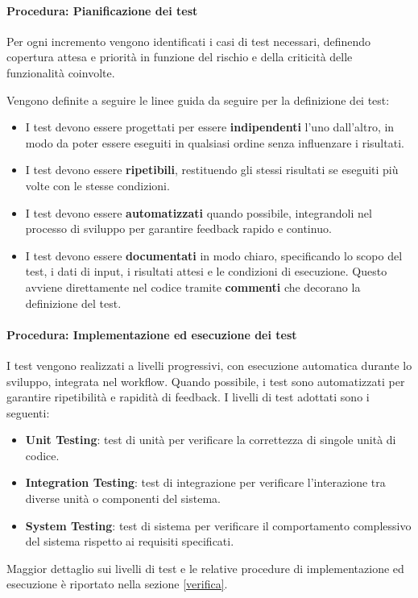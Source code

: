 \documentclass[a4paper,12pt]{article}
\begin{document}
\paragraph{Procedura: Pianificazione dei test}
Per ogni incremento vengono identificati i casi di test necessari, definendo
copertura attesa e priorità in funzione del rischio e della criticità delle
funzionalità coinvolte.

Vengono definite a seguire le linee guida da seguire per la definizione dei test:
\begin{itemize}
    \item I test devono essere progettati per essere \textbf{indipendenti} l'uno dall'altro, in modo da poter essere eseguiti in qualsiasi ordine senza influenzare i risultati.
    \item I test devono essere \textbf{ripetibili}, restituendo gli stessi risultati se eseguiti più volte con le stesse condizioni.
    \item I test devono essere \textbf{automatizzati} quando possibile, integrandoli nel processo di sviluppo per garantire feedback rapido e continuo.
    \item I test devono essere \textbf{documentati} in modo chiaro, specificando lo scopo del test, i dati di input, i risultati attesi e le condizioni di esecuzione. Questo avviene direttamente nel codice tramite \textbf{commenti} che decorano la definizione del test.
\end{itemize}

\paragraph{Procedura: Implementazione ed esecuzione dei test} \label{test}
I test vengono realizzati a livelli progressivi, con esecuzione automatica durante lo sviluppo, integrata nel workflow.
Quando possibile, i test sono automatizzati per garantire ripetibilità e
rapidità di feedback.
I livelli di test adottati sono i seguenti:
\begin{itemize}
    \item \textbf{Unit Testing}: test di unità per verificare la correttezza di singole unità di codice.
    \item \textbf{Integration Testing}: test di integrazione per verificare l'interazione tra diverse unità o componenti del sistema.
    \item \textbf{System Testing}: test di sistema per verificare il comportamento complessivo del sistema rispetto ai requisiti specificati.
\end{itemize}
Maggior dettaglio sui livelli di test e le relative procedure di implementazione ed esecuzione è riportato nella sezione \ref{verifica}.
\end{document}
